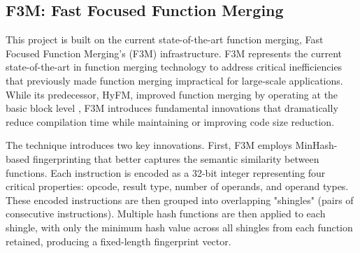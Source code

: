 




\subsection{F3M: Fast Focused Function Merging}
This project is built on the current state-of-the-art function merging, Fast Focused Function Merging's (F3M) infrastructure. F3M represents the current state-of-the-art in function merging technology to address critical inefficiencies that previously made function merging impractical for large-scale applications. While its predecessor, HyFM, improved function merging by operating at the basic block level \cite{HyFM:FunctionMergingForFree}, F3M introduces fundamental innovations that dramatically reduce compilation time while maintaining or improving code size reduction.

The technique introduces two key innovations. First, F3M employs MinHash-based fingerprinting that better captures the semantic similarity between functions. Each instruction is encoded as a 32-bit integer representing four critical properties: opcode, result type, number of operands, and operand types. These encoded instructions are then grouped into overlapping "shingles" (pairs of consecutive instructions).  Multiple hash functions are then applied to each shingle, with only the minimum hash value across all shingles from each function retained, producing a fixed-length fingerprint vector.

